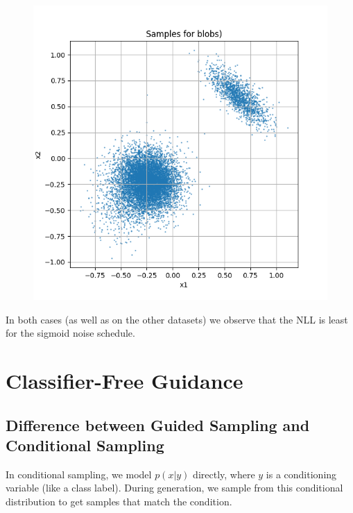 \documentclass[a4paper,12pt]{article}
\begin{document}
\begin{figure}[H]
\begin{minipage}{0.3\textwidth}
  \end{minipage}
  \begin{minipage}{0.3\textwidth}
      \centering
      \includegraphics[width=\linewidth]{images/Samples for ddpm_2_200_0.0001_0.02_blobs_sigmoid.png}
  \end{minipage}
\end{figure}
In both cases (as well as on the other datasets) we observe that the NLL is least for the sigmoid noise schedule.
\clearpage


\section*{Classifier-Free Guidance}

\subsection*{Difference between Guided Sampling and Conditional Sampling}
In conditional sampling, we model $p(x|y)$ directly, where $y$ is a conditioning variable (like a class label). During generation, we sample from this conditional distribution to get samples that match the condition.
\end{document}
